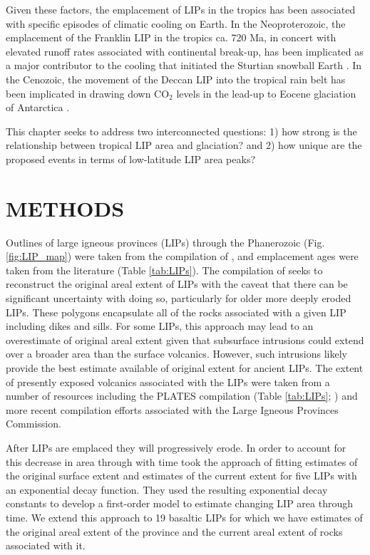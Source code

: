\documentclass[11pt,letterpaper]{article}
\begin{document}
Given these factors, the emplacement of LIPs in the tropics has been associated with specific episodes of climatic cooling on Earth. In the Neoproterozoic, the emplacement of the Franklin LIP in the tropics ca. 720 Ma, in concert with elevated runoff rates associated with continental break-up, has been implicated as a major contributor to the cooling that initiated the Sturtian snowball Earth \citep{Donnadieu2004b, Cox2016}. In the Cenozoic, the movement of the Deccan LIP into the tropical rain belt has been implicated in drawing down CO$_2$ levels in the lead-up to Eocene glaciation of Antarctica \citep{Kent2008a}.


This chapter seeks to address two interconnected questions: 1) how strong is the relationship between tropical LIP area and glaciation? and 2) how unique are the proposed events in terms of low-latitude LIP area peaks?

\section*{METHODS}

Outlines of large igneous provinces (LIPs) through the Phanerozoic (Fig. \ref{fig:LIP_map}) were taken from the compilation of \cite{Ernst2017a}, and emplacement ages were taken from the literature (Table \ref{tab:LIPs}). The compilation of \cite{Ernst2017a} seeks to reconstruct the original areal extent of LIPs with the caveat that there can be significant uncertainty with doing so, particularly for older more deeply eroded LIPs. These polygons encapsulate all of the rocks associated with a given LIP including dikes and sills. For some LIPs, this approach may lead to an overestimate of original areal extent given that subsurface intrusions could extend over a broader area than the surface volcanics. However, such intrusions likely provide the best estimate available of original extent for ancient LIPs. The extent of presently exposed volcanics associated with the LIPs were taken from a number of resources including the PLATES compilation (Table \ref{tab:LIPs}; \citealp{Coffin2006a}) and more recent compilation efforts associated with the Large Igneous Provinces Commission. 

After LIPs are emplaced they will progressively erode. In order to account for this decrease in area through with time \cite{Godderis2017a} took the approach of fitting estimates of the original surface extent and estimates of the current extent for five LIPs with an exponential decay function. They used the resulting exponential decay constants to develop a first-order model to estimate changing LIP area through time. We extend this approach to 19 basaltic LIPs for which we have estimates of the original areal extent of the province and the current areal extent of rocks associated with it.
\end{document}

